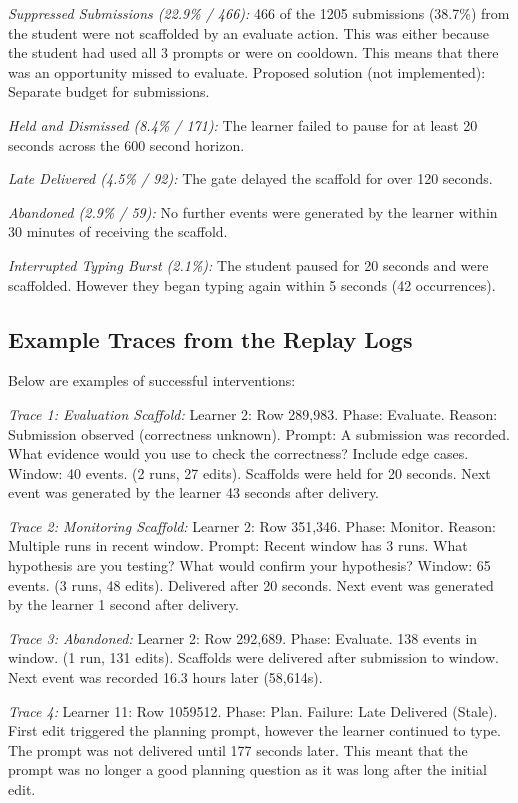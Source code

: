 \documentclass[conference]{IEEEtran}
\begin{document}
\textit{Suppressed Submissions (22.9\% / 466):} 466 of the 1205 submissions (38.7\%) from the student were not scaffolded by an evaluate action. This was either because the student had used all 3 prompts or were on cooldown. This means that there was an opportunity missed to evaluate. Proposed solution (not implemented): Separate budget for submissions.

\textit{Held and Dismissed (8.4\% / 171):} The learner failed to pause for at least 20 seconds across the 600 second horizon.

\textit{Late Delivered (4.5\% / 92):} The gate delayed the scaffold for over 120 seconds.

\textit{Abandoned (2.9\% / 59):} No further events were generated by the learner within 30 minutes of receiving the scaffold.

\textit{Interrupted Typing Burst (2.1\%):} The student paused for 20 seconds and were scaffolded. However they began typing again within 5 seconds (42 occurrences).

\subsection{Example Traces from the Replay Logs}

Below are examples of successful interventions:

\textit{Trace 1: Evaluation Scaffold:} Learner 2: Row 289,983. Phase: Evaluate. Reason: Submission observed (correctness unknown). Prompt: A submission was recorded. What evidence would you use to check the correctness? Include edge cases. Window: 40 events. (2 runs, 27 edits). Scaffolds were held for 20 seconds. Next event was generated by the learner 43 seconds after delivery.

\textit{Trace 2: Monitoring Scaffold:} Learner 2: Row 351,346. Phase: Monitor. Reason: Multiple runs in recent window. Prompt: Recent window has 3 runs. What hypothesis are you testing? What would confirm your hypothesis? Window: 65 events. (3 runs, 48 edits). Delivered after 20 seconds. Next event was generated by the learner 1 second after delivery.

\textit{Trace 3: Abandoned:} Learner 2: Row 292,689. Phase: Evaluate. 138 events in window. (1 run, 131 edits). Scaffolds were delivered after submission to window. Next event was recorded 16.3 hours later (58,614s).

\textit{Trace 4:} Learner 11: Row 1059512. Phase: Plan. Failure: Late Delivered (Stale). First edit triggered the planning prompt, however the learner continued to type. The prompt was not delivered until 177 seconds later. This meant that the prompt was no longer a good planning question as it was long after the initial edit.
\end{document}
